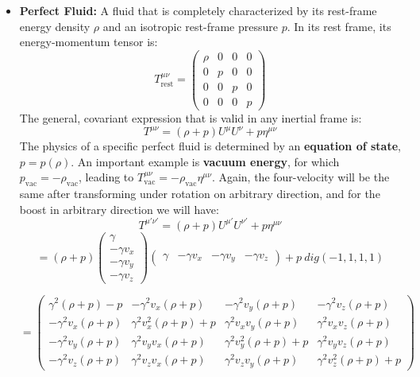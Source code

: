 \documentclass[11pt, a4paper]{report}
\begin{document}
\begin{itemize}
    \item \textbf{Perfect Fluid:} A fluid that is completely characterized by its rest-frame energy density $\rho$ and an isotropic rest-frame pressure $p$. In its rest frame, its energy-momentum tensor is:
    \begin{equation}
        T^{\mu\nu}_{\text{rest}} =
        \begin{pmatrix}
            \rho & 0 & 0 & 0 \\
            0 & p & 0 & 0 \\
            0 & 0 & p & 0 \\
            0 & 0 & 0 & p
        \end{pmatrix}
    \end{equation}
    The general, covariant expression that is valid in any inertial frame is:
    \begin{equation}
        T^{\mu\nu} = (\rho+p)U^\mu U^\nu + p\eta^{\mu\nu}
    \end{equation}
    The physics of a specific perfect fluid is determined by an \textbf{equation of state}, $p = p(\rho)$. An important example is \textbf{vacuum energy}, for which $p_{\text{vac}} = -\rho_{\text{vac}}$, leading to $T^{\mu\nu}_{\text{vac}} = -\rho_{\text{vac}}\eta^{\mu\nu}$.
    Again, the four-velocity will be the same after transforming under rotation on arbitrary direction, and for the boost in arbitrary direction we will have:
    $$T^{\mu'\nu'} = (\rho + p) U^{\mu'} U^{\nu'} + p \eta^{\mu\nu}$$
    $$= (\rho + p)
    \begin{pmatrix}
        \gamma \\
        -\gamma v_x \\
        -\gamma v_y \\
        -\gamma v_z
    \end{pmatrix}
    \begin{pmatrix}
        \gamma & -\gamma v_x & -\gamma v_y & -\gamma v_z
    \end{pmatrix}+ p \ dig(-1,1,1,1) $$

    $$ =
    \begin{pmatrix}
    \gamma^2(\rho + p) - p & -\gamma^2 v_x (\rho + p) & -\gamma^2 v_y (\rho + p) & -\gamma^2 v_z (\rho + p) \\
    -\gamma^2 v_x (\rho + p) & \gamma^2 v_x^2 (\rho + p) + p & \gamma^2 v_x v_y (\rho + p) & \gamma^2 v_x v_z (\rho + p) \\
    -\gamma^2 v_y (\rho + p) & \gamma^2 v_y v_x (\rho + p) & \gamma^2 v_y^2 (\rho + p) + p & \gamma^2 v_y v_z (\rho + p) \\
    -\gamma^2 v_z (\rho + p) & \gamma^2 v_z v_x (\rho + p) & \gamma^2 v_z v_y (\rho + p) & \gamma^2 v_z^2 (\rho + p) + p
    \end{pmatrix} 
    $$
\end{itemize}
\end{document}
